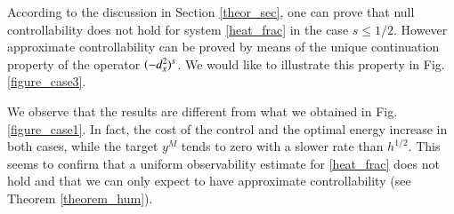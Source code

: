 According to the discussion in Section \ref{theor_sec}, one can prove that null controllability does not hold for system \eqref{heat_frac} in the case $s\leq 1/2$. However approximate controllability can be proved by means of the unique continuation property of the operator $(-d_x^2)^{s}$. We would like to illustrate this property in Fig. \ref{figure_case3}.


We observe that the results are different from what we obtained in Fig.  \ref{figure_case1}. In fact, the cost of the control and the optimal energy increase in both cases, while the target $y^M$ tends to zero with a slower rate than $h^{1/2}$. This seems to confirm that a uniform observability estimate for \eqref{heat_frac} does not hold and that we can only expect to have approximate controllability (see Theorem \ref{theorem_hum}).
%
